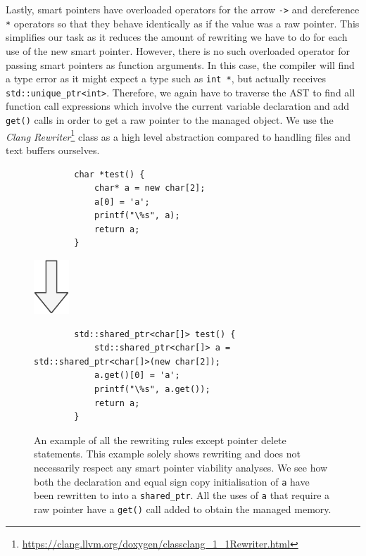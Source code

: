 \documentclass{mpaper}
\begin{document}
    Lastly, smart pointers have overloaded operators for the arrow \texttt{->} and dereference \texttt{*} operators so that they behave identically as if the value was a raw pointer.
    This simplifies our task as it reduces the amount of rewriting we have to do for each use of the new smart pointer.
    However, there is no such overloaded operator for passing smart pointers as function arguments. 
    In this case, the compiler will find a type error as it might expect a type such as \texttt{int *}, but actually receives \texttt{std::unique_ptr<int>}. 
    Therefore, we again have to traverse the AST to find all function call expressions which involve the current variable declaration and add \texttt{get()} calls in order to get a raw pointer to the managed object.
    We use the \emph{Clang Rewriter}\footnote{\url{https://clang.llvm.org/doxygen/classclang_1_1Rewriter.html}} class as a high level abstraction compared to handling files and text buffers ourselves.
    
    \begin{figure}
        \centering
        \begin{verbatim}
        char *test() {
            char* a = new char[2];
            a[0] = 'a';
            printf("\%s", a);
            return a;
        }
        \end{verbatim}
        
        \includegraphics{images/arrow.pdf}
        
        \begin{verbatim}
        std::shared_ptr<char[]> test() {
            std::shared_ptr<char[]> a = std::shared_ptr<char[]>(new char[2]);
            a.get()[0] = 'a';
            printf("\%s", a.get());
            return a;
        }
        \end{verbatim}
        
        \caption{An example of all the rewriting rules except pointer delete statements. This example solely shows rewriting and does not necessarily respect any smart pointer viability analyses. We see how both the declaration and equal sign copy initialisation of \texttt{a} have been rewritten to into a \texttt{shared\_ptr}. All the uses of \texttt{a}  that require a raw pointer have a \texttt{get()} call added to obtain the managed memory.}
        \label{fig:rewriting}
    \end{figure}
    
\end{document}
